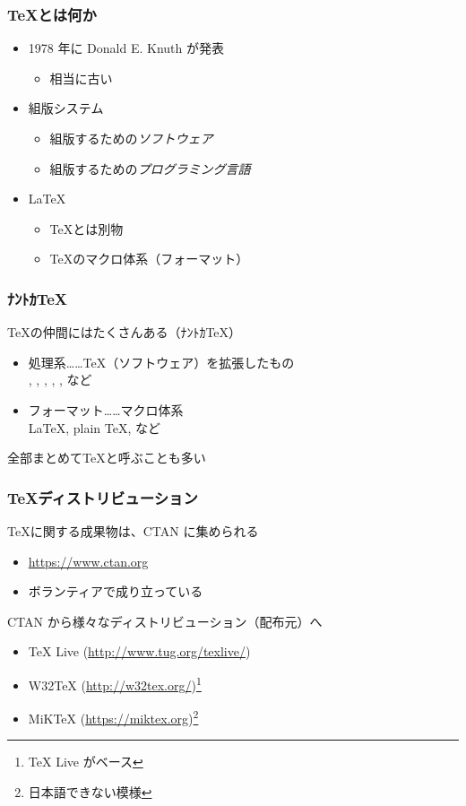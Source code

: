 \documentclass[unicode,12pt,colorlinks,handout]{beamer}
\begin{document}
\begin{frame}
	\frametitle{\TeX とは何か}
	\begin{itemize}
		\item 1978 年に Donald E. Knuth が発表
			\begin{itemize}
				\item 相当に古い
			\end{itemize}
		\item 組版システム
			\begin{itemize}
				\item 組版するための\emph{ソフトウェア}
				\item 組版するための\emph{プログラミング言語}
			\end{itemize}
			\pause
		\item \LaTeX
			\begin{itemize}
				\item \TeX とは別物
				\item \TeX のマクロ体系（フォーマット）
			\end{itemize}
	\end{itemize}
\end{frame}

\begin{frame}
	\frametitle{ﾅﾝﾄｶ\TeX}
	\TeX の仲間にはたくさんある（ﾅﾝﾄｶ\TeX ）
	\begin{itemize}
		\item 処理系……\TeX （ソフトウェア）を拡張したもの\\
			{\eTeX}, {\pdfTeX}, {\XeTeX}, {\LuaTeX}, {\pTeX}, {\upTeX} など
		\item フォーマット……マクロ体系\\
			{\LaTeX}, {plain \TeX}, {\ConTeXt} など
	\end{itemize}
	全部まとめて\TeX と呼ぶことも多い
\end{frame}

\begin{frame}
	\frametitle{\TeX ディストリビューション}
	\TeX に関する成果物は、CTAN に集められる
	\begin{itemize}
		\item \url{https://www.ctan.org}
		\item ボランティアで成り立っている
	\end{itemize}
	
	CTAN から様々なディストリビューション（配布元）へ
	\begin{itemize}
		\item {\TeX} Live (\url{http://www.tug.org/texlive/})
		\item W32TeX (\url{http://w32tex.org/})\footnote{{\TeX} Live がベース}
		\item MiK{\TeX} (\url{https://miktex.org})\footnote{日本語できない模様}
	\end{itemize}
\end{frame}
\end{document}
